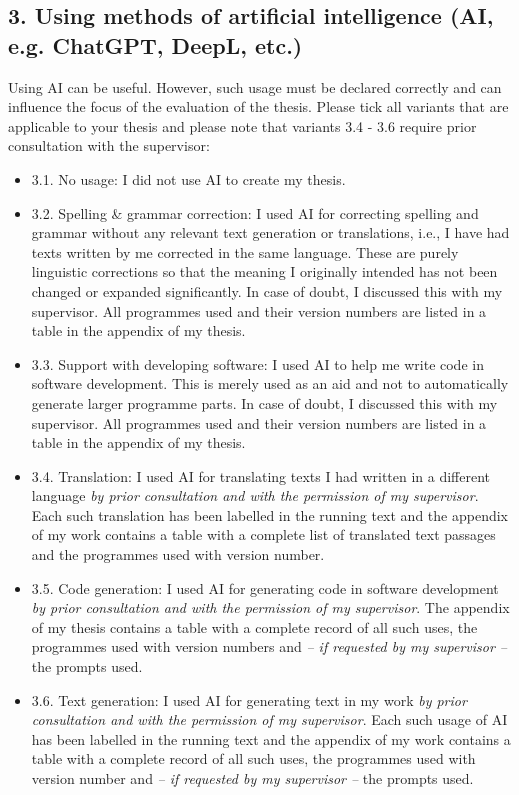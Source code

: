 {        \subsection*{3. Using methods of artificial intelligence (AI, e.g. ChatGPT, DeepL, etc.)}
        Using AI can be useful. However, such usage must be declared correctly and can influence the focus of the evaluation of the thesis. Please tick all variants that are applicable to your thesis and please note that variants 3.4 - 3.6 require prior consultation with the supervisor:
        \begin{itemize}
            \item[$\square$] 3.1. No usage: I did not use AI to create my thesis.
            \item[$\square$] 3.2. Spelling \& grammar correction: I used AI for correcting spelling and grammar without any relevant text generation or translations, i.e., I have had texts written by me corrected in the same language. These are purely linguistic corrections so that the meaning I originally intended has not been changed or expanded significantly. In case of doubt, I discussed this with my supervisor. All programmes used and their version numbers are listed in a table in the appendix of my thesis.
            \item[$\square$] 3.3. Support with developing software: I used AI to help me write code in software development. This is merely used as an aid and not to automatically generate larger programme parts. In case of doubt, I discussed this with my supervisor. All programmes used and their version numbers are listed in a table in the appendix of my thesis.
            \item[$\square$] 3.4. Translation: I used AI for translating texts I had written in a different language \textit{by prior consultation and with the permission of my supervisor}. Each such translation has been labelled in the running text and the appendix of my work contains a table with a complete list of translated text passages and the programmes used with version number.
            \item[$\square$] 3.5. Code generation: I used AI for generating code in software development \textit{by prior consultation and with the permission of my supervisor}. The appendix of my thesis contains a table with a complete record of all such uses, the programmes used with version numbers and \textit{-- if requested by my supervisor --} the prompts used.
            \item[$\square$] 3.6. Text generation: I used AI for generating text in my work \textit{by prior consultation and with the permission of my supervisor}. Each such usage of AI has been labelled in the running text and the appendix of my work contains a table with a complete record of all such uses, the programmes used with version number and \textit{-- if requested by my supervisor --} the prompts used.
        \end{itemize}

}
